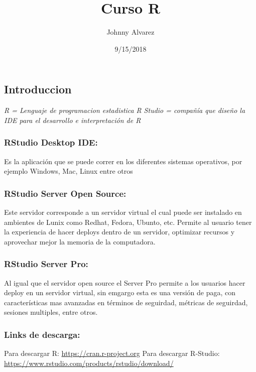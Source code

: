 \documentclass[]{article}
\title{Curso R}
\author{Johnny Alvarez}
\date{9/15/2018}
\begin{document}
\maketitle

\subsection{Introduccion}\label{introduccion}

\emph{R = Lenguaje de programacion estadistica} \emph{R Studio =
compañía que diseño la IDE para el desarrollo e interpretación de R}

\subsubsection{RStudio Desktop IDE:}\label{rstudio-desktop-ide}

Es la aplicación que se puede correr en los diferentes sistemas
operativos, por ejemplo Windows, Mac, Linux entre otros

\subsubsection{RStudio Server Open
Source:}\label{rstudio-server-open-source}

Este servidor corresponde a un servidor virtual el cual puede ser
instalado en ambientes de Lunix como Redhat, Fedora, Ubunto, etc.
Permite al usuario tener la experiencia de hacer deploys dentro de un
servidor, optimizar recursos y aprovechar mejor la memoria de la
computadora.

\subsubsection{RStudio Server Pro:}\label{rstudio-server-pro}

Al igual que el servidor open source el Server Pro permite a los
usuarios hacer deploy en un servidor virtual, sin emgargo esta es una
versión de paga, con características mas avanzadas en términos de
seguirdad, métricas de seguirdad, sesiones multiples, entre otros.

\subsubsection{Links de descarga:}\label{links-de-descarga}

Para descargar R: \url{https://cran.r-project.org} Para descargar
R-Studio: \url{https://www.rstudio.com/products/rstudio/download/}
\end{document}
